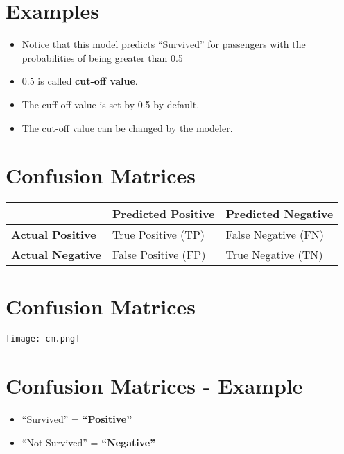 \documentclass[
]{article}
\providecommand{\tightlist}{%
  \setlength{\itemsep}{0pt}\setlength{\parskip}{0pt}}
\begin{document}
\hypertarget{examples-1}{%
\section{Examples}\label{examples-1}}

\begin{itemize}
\tightlist
\item
  Notice that this model predicts ``Survived'' for passengers with the
  probabilities of being greater than 0.5
\item
  0.5 is called \textbf{cut-off value}.
\item
  The cuff-off value is set by 0.5 by default.
\item
  The cut-off value can be changed by the modeler.
\end{itemize}

\hypertarget{confusion-matrices}{%
\section{Confusion Matrices}\label{confusion-matrices}}

\begin{longtable}[]{@{}lll@{}}
\toprule
& Predicted Positive & Predicted Negative\tabularnewline
\midrule
\endhead
\textbf{Actual Positive} & True Positive (TP) & False Negative
(FN)\tabularnewline
\textbf{Actual Negative} & False Positive (FP) & True Negative
(TN)\tabularnewline
\bottomrule
\end{longtable}

\hypertarget{confusion-matrices-1}{%
\section{Confusion Matrices}\label{confusion-matrices-1}}

\texttt{[image: cm.png]}

\hypertarget{confusion-matrices---example}{%
\section{Confusion Matrices -
Example}\label{confusion-matrices---example}}

\begin{itemize}
\tightlist
\item
  ``Survived'' = \textbf{``Positive''}
\item
  ``Not Survived'' = \textbf{``Negative''}
\end{itemize}
\end{document}
